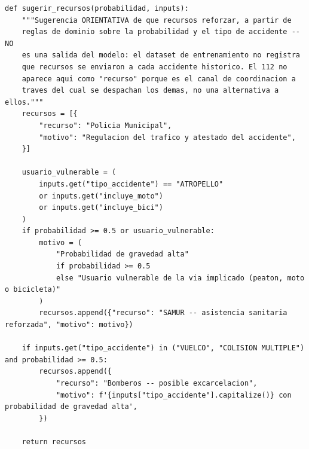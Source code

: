 \documentclass[11pt,a4paper]{article}
\begin{document}
\begin{lstlisting}[caption={Sugerencia de recursos, por reglas de negocio, a partir de la probabilidad del modelo y el tipo de accidente.}]
def sugerir_recursos(probabilidad, inputs):
    """Sugerencia ORIENTATIVA de que recursos reforzar, a partir de
    reglas de dominio sobre la probabilidad y el tipo de accidente -- NO
    es una salida del modelo: el dataset de entrenamiento no registra
    que recursos se enviaron a cada accidente historico. El 112 no
    aparece aqui como "recurso" porque es el canal de coordinacion a
    traves del cual se despachan los demas, no una alternativa a ellos."""
    recursos = [{
        "recurso": "Policia Municipal",
        "motivo": "Regulacion del trafico y atestado del accidente",
    }]

    usuario_vulnerable = (
        inputs.get("tipo_accidente") == "ATROPELLO"
        or inputs.get("incluye_moto")
        or inputs.get("incluye_bici")
    )
    if probabilidad >= 0.5 or usuario_vulnerable:
        motivo = (
            "Probabilidad de gravedad alta"
            if probabilidad >= 0.5
            else "Usuario vulnerable de la via implicado (peaton, moto o bicicleta)"
        )
        recursos.append({"recurso": "SAMUR -- asistencia sanitaria reforzada", "motivo": motivo})

    if inputs.get("tipo_accidente") in ("VUELCO", "COLISION MULTIPLE") and probabilidad >= 0.5:
        recursos.append({
            "recurso": "Bomberos -- posible excarcelacion",
            "motivo": f'{inputs["tipo_accidente"].capitalize()} con probabilidad de gravedad alta',
        })

    return recursos
\end{lstlisting}
\end{document}

